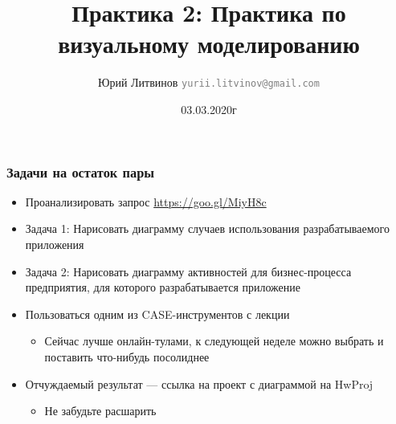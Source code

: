 \documentclass[xetex,mathserif,serif]{beamer}
\title{Практика 2: Практика по визуальному моделированию}
\author[Юрий Литвинов]{Юрий Литвинов \newline \textcolor{gray}{\small\texttt{yurii.litvinov@gmail.com}}}
\date{03.03.2020г}
\begin{document}
	
	\frame{\titlepage}

	\begin{frame}
		\frametitle{Задачи на остаток пары}
		\begin{itemize}
			\item Проанализировать запрос \url{https://goo.gl/MiyH8c}
			\item Задача 1: Нарисовать диаграмму случаев использования разрабатываемого приложения
			\item Задача 2: Нарисовать диаграмму активностей для бизнес-процесса предприятия, для которого разрабатывается приложение
			\item Пользоваться одним из CASE-инструментов с лекции
			\begin{itemize}
				\item Сейчас лучше онлайн-тулами, к следующей неделе можно выбрать и поставить что-нибудь посолиднее
			\end{itemize}
			\item Отчуждаемый результат --- ссылка на проект с диаграммой на HwProj
			\begin{itemize}
				\item Не забудьте расшарить
			\end{itemize}
		\end{itemize}
	\end{frame}
\end{document}
